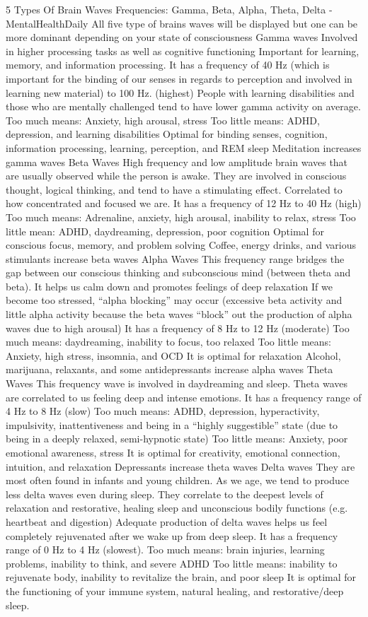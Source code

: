 \documentclass{article}
\begin{document}
5 Types Of Brain Waves Frequencies: Gamma, Beta, Alpha, Theta, Delta - MentalHealthDaily
All five type of brains waves will be displayed but one can be more dominant depending on your state of consciousness 
Gamma waves
Involved in higher processing tasks as well as cognitive functioning 
Important for learning, memory, and information processing.
It has a frequency of 40 Hz (which is important for the binding of our senses in regards to perception and involved in learning new material) to 100 Hz. (highest)
People with learning disabilities and those who are mentally challenged tend to have lower gamma activity on average.
Too much means: Anxiety, high arousal, stress
Too little means: ADHD, depression, and learning disabilities 
Optimal for binding senses, cognition, information processing, learning, perception, and REM sleep 
Meditation increases gamma waves
Beta Waves
High frequency and low amplitude brain waves that are usually observed while the person is awake. 
They are involved in conscious thought, logical thinking, and tend to have a stimulating effect.
Correlated to how concentrated and focused we are.
It has a frequency of 12 Hz to 40 Hz (high)
Too much means: Adrenaline, anxiety, high arousal, inability to relax, stress
Too little mean: ADHD, daydreaming, depression, poor cognition
Optimal for conscious focus, memory, and problem solving
Coffee, energy drinks, and various stimulants increase beta waves
Alpha Waves
This frequency range bridges the gap between our conscious thinking and subconscious mind (between theta and beta).
It helps us calm down and promotes feelings of deep relaxation 
If we become too stressed, “alpha blocking” may occur (excessive beta activity and little alpha activity because the beta waves “block” out the production of alpha waves due to high arousal)
It has a frequency of 8 Hz to 12 Hz (moderate)
Too much means: daydreaming, inability to focus, too relaxed
Too little means: Anxiety, high stress, insomnia, and OCD
It is optimal for relaxation
Alcohol, marijuana, relaxants, and some antidepressants increase alpha waves
Theta Waves
This frequency wave is involved in daydreaming and sleep.
Theta waves are correlated to us feeling deep and intense emotions.
It has a frequency range of 4 Hz to 8 Hz (slow)
Too much means: ADHD, depression, hyperactivity, impulsivity, inattentiveness and being in a “highly suggestible” state (due to being in a deeply relaxed, semi-hypnotic state)
Too little means: Anxiety, poor emotional awareness, stress
It is optimal for creativity, emotional connection, intuition, and relaxation
Depressants increase theta waves
Delta waves
They are most often found in infants and young children. As we age, we tend to produce less delta waves even during sleep.
They correlate to the deepest levels of relaxation and restorative, healing sleep and unconscious bodily functions (e.g. heartbeat and digestion)
Adequate production of delta waves helps us feel completely rejuvenated after we wake up from deep sleep.
It has a frequency range of 0 Hz to 4 Hz (slowest).
Too much means: brain injuries, learning problems, inability to think, and severe ADHD
Too little means: inability to rejuvenate body, inability to revitalize the brain, and poor sleep
It is optimal for the functioning of your immune system, natural healing, and restorative/deep sleep.
\end{document}
